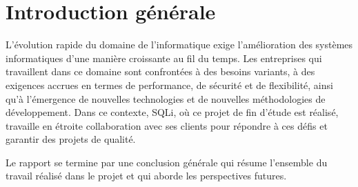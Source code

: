\chapter*{Introduction générale}

\label{chap:introduction}

\par L'évolution rapide du domaine de l'informatique exige l'amélioration des systèmes informatiques d'une manière croissante au fil du temps. Les entreprises qui travaillent dans ce domaine sont confrontées à des besoins variants, à des exigences accrues en termes de performance, de sécurité et de flexibilité, ainsi qu'à l'émergence de nouvelles technologies et de nouvelles méthodologies de développement. Dans ce contexte, SQLi, où ce projet de fin d'étude est réalisé, travaille en étroite collaboration avec ses clients pour répondre à ces défis et garantir des projets de qualité.\\

\par Le rapport se termine par une conclusion générale qui résume l'ensemble du travail réalisé dans le projet et qui aborde les perspectives futures. \\


